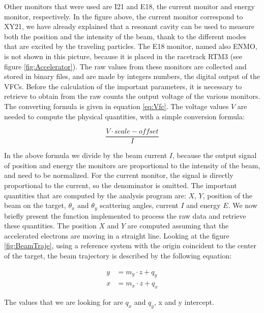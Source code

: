 \begin{appendices}
Other monitors that were used are I21 and E18, the current monitor and energy monitor, respectively. In the figure above, the current monitor correspond to XY21, we have already explained that a resonant cavity can be used to measure both the position and the intensity of the beam, thank to the different modes that are excited by the traveling particles. The E18 monitor, named also ENMO, is not shown in this picture, because it is placed in the racetrack RTM3 (see figure \ref{fig:Accelerator}). 
The raw values from these monitors are collected and stored in binary files, and are made by integers numbers, the digital output of the VFCs. Before the calculation of the important parameters, it is necessary to retrieve to obtain from the raw counts the output voltage of the various monitors. The converting formula is given in equation \ref{eq:Vfc}. The voltage values $V$ are needed to compute the physical quantities, with a simple conversion formula:

\begin{equation}
\dfrac{V \cdot scale - offset}{I}
\end{equation}

In the above formula we divide by the beam current $I$, because the output signal of position and energy the monitors are proportional to the intensity of the beam, and need to be normalized. For the current monitor, the signal is directly proportional to the current, so the denominator is omitted.
The important quantities that are computed by the analysis program are: $X$, $Y$, position of the beam on the target, $\theta_{x}$ and $\theta_{y}$ scattering angles, current $I$ and energy $E$. 
We now briefly present the function implemented to process the raw data and retrieve these quantities. \medskip
The position $X$ and $Y$ are computed assuming that the accelerated electrons are moving in a straight line. Looking at the figure \ref{fig:BeamTraje}, using a reference system with the origin coincident to the center of the target, the beam trajectory is described by the following equation:

\begin{align*}
y &= m_{y} \cdot z + q_{y} \\
x &= m_{x} \cdot z + q_{x}
\end{align*}

The values that we are looking for are $q_{x}$ and $q_{y}$, x and y intercept. 


\end{appendices}
